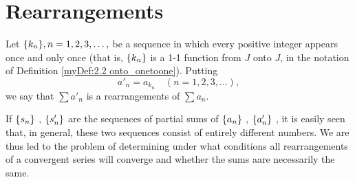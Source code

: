 \section{Rearrangements}

\begin{myDef}
    \label{myDef:3.52}
    Let $\protect\{k_n\}, n=1,2,3,\dots,$ be a sequence in which every positive integer appears once and only once 
    (that is, $\protect\{k_n\}$ is a 1-1 function from $J$ onto $J$, in the notation of Definition \ref{myDef:2.2 onto_onetoone}).
    Putting
    \begin{equation*}
        a'_n = a_{k_n} \quad (n = 1,2,3,\dots),
    \end{equation*}
    we say that $\sum a'_n$ is a rearrangements of $\sum a_n$.
\end{myDef}

If 
$\protect\{s_n\}$ ,
$\protect\{s'_n\}$ 
are the sequences of partial sums of 
$\protect\{a_n\}$ ,
$\protect\{a'_n\}$ ,
it is easily seen that, in general,
these two sequences consist of entirely different numbers.
We are thus led to the problem of determining under what conditions all rearrangements of a convergent series will converge and whether the sums aare necessarily the same.

